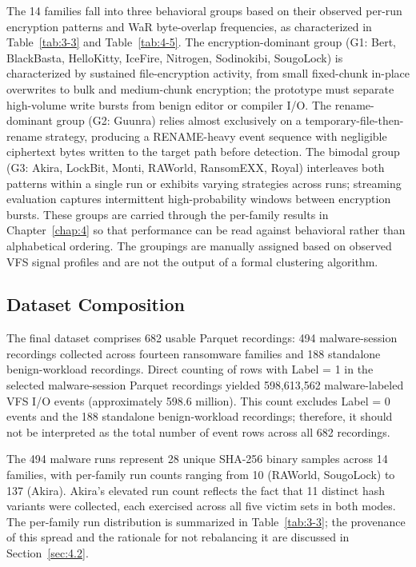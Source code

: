 The 14 families fall into three behavioral groups based on their observed per-run encryption patterns and WaR byte-overlap frequencies, as characterized in Table~\ref{tab:3-3} and Table~\ref{tab:4-5}. The encryption-dominant group (G1: Bert, BlackBasta, HelloKitty, IceFire, Nitrogen, Sodinokibi, SougoLock) is characterized by sustained file-encryption activity, from small fixed-chunk in-place overwrites to bulk and medium-chunk encryption; the prototype must separate high-volume write bursts from benign editor or compiler I/\allowbreak{}O. The rename-dominant group (G2: Guunra) relies almost exclusively on a temporary-file-then-rename strategy, producing a RENAME-heavy event sequence with negligible ciphertext bytes written to the target path before detection. The bimodal group (G3: Akira, LockBit, Monti, RAWorld, RansomEXX, Royal) interleaves both patterns within a single run or exhibits varying strategies across runs; streaming evaluation captures intermittent high-probability windows between encryption bursts. These groups are carried through the per-family results in Chapter~\ref{chap:4} so that performance can be read against behavioral rather than alphabetical ordering. The groupings are manually assigned based on observed VFS signal profiles and are not the output of a formal clustering algorithm.

\subsection{Dataset Composition}\label{sec:3.3.2}

The final dataset comprises 682 usable Parquet recordings: 494 malware-session recordings collected across fourteen ransomware families and 188 standalone benign-workload recordings. Direct counting of rows with Label = 1 in the selected malware-session Parquet recordings yielded 598,613,562 malware-labeled VFS I/\allowbreak{}O events (approximately 598.6 million). This count excludes Label = 0 events and the 188 standalone benign-workload recordings; therefore, it should not be interpreted as the total number of event rows across all 682 recordings.

The 494 malware runs represent 28 unique SHA-256 binary samples across 14 families, with per-family run counts ranging from 10 (RAWorld, SougoLock) to 137 (Akira). Akira's elevated run count reflects the fact that 11 distinct hash variants were collected, each exercised across all five victim sets in both modes. The per-family run distribution is summarized in Table~\ref{tab:3-3}; the provenance of this spread and the rationale for not rebalancing it are discussed in Section~\ref{sec:4.2}.

